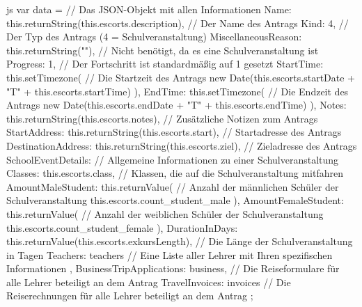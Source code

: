 \begin{code}{js}
var data = {		// Das JSON-Objekt mit allen Informationen
	Name: this.returnString(this.escorts.description),	// Der Name des Antrags
	Kind: 4,	// Der Typ des Antrags (4 = Schulveranstaltung)
	MiscellaneousReason: this.returnString(""),			// Nicht benötigt, da es eine Schulveranstaltung ist
	Progress: 1,	// Der Fortschritt ist standardmäßig auf 1 gesetzt
	StartTime: this.setTimezone(	// Die Startzeit des Antrags
	new Date(this.escorts.startDate + "T" + this.escorts.startTime)
	),
	EndTime: this.setTimezone(	// Die Endzeit des Antrags
	new Date(this.escorts.endDate + "T" + this.escorts.endTime)
	),
	Notes: this.returnString(this.escorts.notes),	// Zusätzliche Notizen zum Antrags
	StartAddress: this.returnString(this.escorts.start),	// Startadresse des Antrags
	DestinationAddress: this.returnString(this.escorts.ziel), // Zieladresse des Antrags
	SchoolEventDetails: {	// Allgemeine Informationen zu einer Schulveranstaltung
		Classes: this.escorts.class,	// Klassen, die auf die Schulveranstaltung mitfahren
		AmountMaleStudent: this.returnValue(	// Anzahl der männlichen Schüler der Schulveranstaltung
		this.escorts.count_student_male
		),
		AmountFemaleStudent: this.returnValue(	// Anzahl der weiblichen Schüler der Schulveranstaltung
		this.escorts.count_student_female
		),
		DurationInDays: this.returnValue(this.escorts.exkursLength),	// Die Länge der Schulveranstaltung in Tagen
		Teachers: teachers	// Eine Liste aller Lehrer mit Ihren spezifischen Informationen
	},
	BusinessTripApplications: business,	// Die Reiseformulare für alle Lehrer beteiligt an dem Antrag
	TravelInvoices: invoices	// Die Reiserechnungen für alle Lehrer beteiligt an dem Antrag
};
\end{code}
~\\
\newpage
